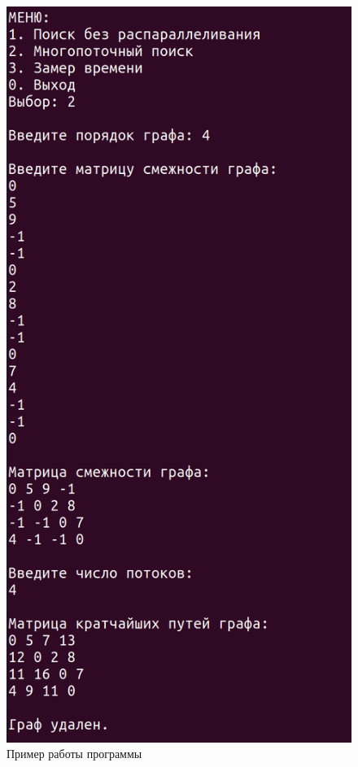 \begin{figure}[H]
	\begin{center}
		\includegraphics[scale=0.3]{img/example.png}
	\end{center}
	\captionsetup{justification=centering}
	\caption{Пример работы программы}
	\label{img:example}
\end{figure}

